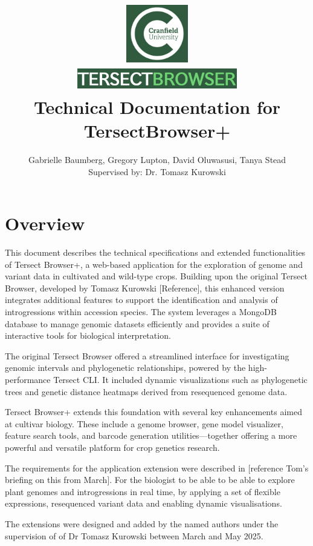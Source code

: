 \documentclass[12pt]{article}
\title{
{\includegraphics[width=3cm, height=2.5cm]{Cran.jpg}}
\\
\includegraphics[width=7cm, height=1cm]{TB.jpg}
\\
{Technical Documentation for TersectBrowser+}
}
\author{Gabrielle Baumberg, Gregory Lupton, David Oluwasusi, Tanya Stead \\ Supervised by: Dr. Tomasz Kurowski}
\begin{document}
\sloppy %

\maketitle

\section{Overview}
This document describes the technical specifications and extended functionalities of Tersect Browser+, a web-based application for the exploration of genome and variant data in cultivated and wild-type crops. Building upon the original Tersect Browser, developed by Tomasz Kurowski [Reference], this enhanced version integrates additional features to support the identification and analysis of introgressions within accession species. The system leverages a MongoDB database to manage genomic datasets efficiently and provides a suite of interactive tools for biological interpretation.

The original Tersect Browser offered a streamlined interface for investigating genomic intervals and phylogenetic relationships, powered by the high-performance Tersect CLI. It included dynamic visualizations such as phylogenetic trees and genetic distance heatmaps derived from resequenced genome data.

Tersect Browser+ extends this foundation with several key enhancements aimed at cultivar biology. These include a genome browser, gene model visualizer, feature search tools, and barcode generation utilities—together offering a more powerful and versatile platform for crop genetics research.

The requirements for the application extension were described in [reference Tom’s briefing on this from March]. For the biologist to be able to be able to explore plant genomes and introgressions in real time, by applying a set of flexible expressions, resequenced variant data and enabling dynamic visualisations.  

The extensions were designed and added by the named authors under the supervision of of Dr Tomasz Kurowski between March and May 2025. 

\end{document}
